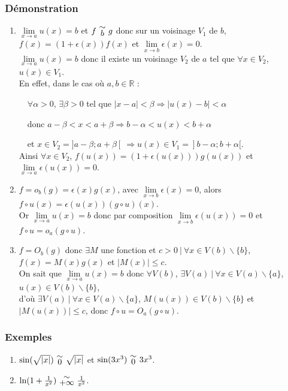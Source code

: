 \documentclass[a4paper,10pt]{book} %
\newcommand{\R}{\mathbb{R}}
\newcommand{\equi}[1]{\renewcommand{\arraystretch}{0.3}~\begin{matrix}\sim\\#1\end{matrix}~\renewcommand{\arraystretch}{1}}
\newcommand{\abs}[1]{\left|#1\right|}
\newcommand{\tq}{~|~}
\begin{document}
\subsubsection{Démonstration}
\begin{enumerate}
\item $\lim\limits_{x\rightarrow a}u(x)=b$ et $f \equi{b} g$
donc sur un voisinage $V_1$ de $b$, $f(x)=(1+\epsilon(x))f(x)$ et $\lim\limits_{x\rightarrow b}\epsilon(x)=0$.\\

$\lim\limits_{x\rightarrow a}u(x)=b$ donc il existe un voisinage $V_2$ de $a$ tel que $\forall x\in V_2$, $u(x)\in V_1$.\\

En effet, dans le cas où $a,b\in \R$ :

~~$\forall \alpha>0$, $\exists \beta>0$ tel que $|x-a|<\beta \Rightarrow |u(x)-b|<\alpha$

~~donc $a-\beta<x<a+\beta\Rightarrow b-\alpha<u(x)<b+\alpha$

~~et $x\in V_2=]a-\beta ; a+\beta[ ~\Rightarrow  u(x)\in V_1=]b-\alpha ;b+\alpha[$.\\

Ainsi $\forall x\in V_2$, $f(u(x))=(1+\epsilon(u(x)))g(u(x))$ et $\lim\limits_{x\rightarrow a}\epsilon(u(x))=0$.\\

\item $f=o_b(g)=\epsilon(x)g(x)$, avec $\lim\limits_{x\rightarrow b}\epsilon(x)=0$, alors $f\circ u(x)=\epsilon(u(x))(g\circ u)(x)$.\\
Or $\lim\limits_{x\rightarrow a}u(x)=b$ donc par composition $\lim\limits_{x\rightarrow b}\epsilon(u(x))=0$ et $f\circ u=o_a(g\circ u)$.\\

\item $f=O_b(g)$ donc $\exists M$ une fonction et $c>0 \tq \forall x\in V(b)\backslash \{b\}$, $f(x)=M(x)g(x)$ et $\abs{M(x)}\leq c$.\\
On sait que $\lim\limits_{x\rightarrow a}u(x)=b$ donc $\forall V(b)$, $\exists V(a) \tq \forall x\in V(a)\backslash\{a\}$, $u(x)\in V(b)\backslash\{b\}$,\\d'où $\exists V(a) \tq \forall x\in V(a)\backslash\{a\}$, $M(u(x))\in V(b)\backslash\{b\}$ et $\abs{M(u(x))}\leq c$, donc $f\circ u=O_a(g\circ u)$.
\end{enumerate}

\subsubsection{Exemples}
\begin{enumerate}
\item $\sin(\sqrt{|x|}) \equi{0} \sqrt{|x|}$ et $\sin(3x^3) \equi{0} 3x^3$.
\item $\ln(1+\frac{1}{x^2}) \equi{+\infty}\frac{1}{x^2}$.
\end{enumerate}
\end{document}
